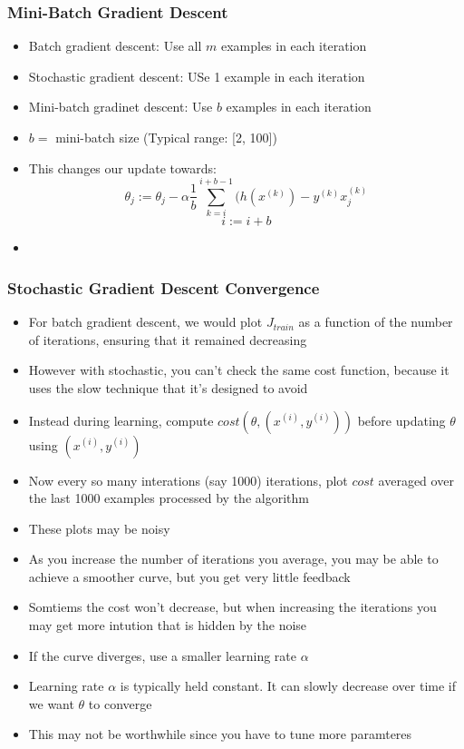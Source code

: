 \subsubsection{Mini-Batch Gradient Descent}
\begin{itemize}[--]
	\item Batch gradient descent: Use all $m$ examples in each iteration
	\item Stochastic gradient descent: USe 1 example in each iteration
	\item Mini-batch gradinet descent: Use $b$ examples in each iteration
	\item $b=$ mini-batch size (Typical range: [2, 100])
	\item This changes our update towards:
		$$\theta_j := \theta_j - \alpha\frac{1}{b}\sum_{k=i}^{i+b-1} (h(x^{(k)}) - y^{(k)} x_j^{(k)}$$
		$$i := i + b$$
	\item 
\end{itemize}

\subsubsection{Stochastic Gradient Descent Convergence}
\begin{itemize}[--]
	\item For batch gradient descent, we would plot $J_{train}$ as a function of the number of iterations, ensuring that it remained decreasing
	\item However with stochastic, you can't check the same cost function, because it uses the slow technique that it's designed to avoid
	\item Instead during learning, compute $cost(\theta, (x^{(i)}, y^{(i)}))$ before updating $\theta$ using $(x^{(i)}, y^{(i)})$
	\item Now every so many interations (say 1000) iterations, plot $cost$ averaged over the last 1000 examples processed by the algorithm
	\item These plots may be noisy
	\item As you increase the number of iterations you average, you may be able to achieve a smoother curve, but you get very little feedback
	\item Somtiems the cost won't decrease, but when increasing the iterations you may get more intution that is hidden by the noise
	\item If the curve diverges, use a smaller learning rate $\alpha$
	\item Learning rate $\alpha$ is typically held constant. It can slowly decrease over time if we want $\theta$ to converge
	\item This may not be worthwhile since you have to tune more paramteres
\end{itemize}

